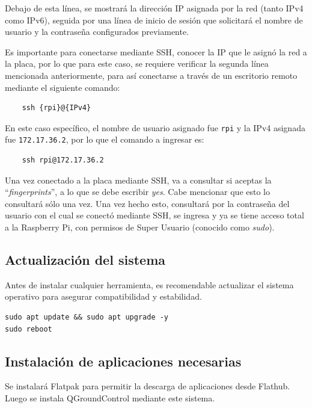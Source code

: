 \documentclass[12pt]{article}
\begin{document}
Debajo de esta línea, se mostrará la dirección IP asignada por la red (tanto IPv4 como IPv6), seguida por una línea de inicio de sesión que solicitará el nombre de usuario y la contraseña configurados previamente.

Es importante para conectarse mediante SSH, conocer la IP que le asignó la red a la placa, por lo que para este caso, se requiere verificar la segunda línea mencionada anteriormente, para así conectarse a través de un escritorio remoto mediante el siguiente comando:

\begin{lstlisting}
    ssh {rpi}@{IPv4}
\end{lstlisting}

En este caso específico, el nombre de usuario asignado fue \texttt{rpi} y la IPv4 asignada fue \texttt{172.17.36.2}, por lo que el comando a ingresar es:

\begin{lstlisting}
    ssh rpi@172.17.36.2
\end{lstlisting}

Una vez conectado a la placa mediante SSH, va a consultar si aceptas la ``\textit{fingerprints}'', a lo que se debe escribir \textit{yes}. Cabe mencionar que esto lo consultará sólo una vez. Una vez hecho esto, consultará por la contraseña del usuario con el cual se conectó mediante SSH, se ingresa y ya se tiene acceso total a la Raspberry Pi, con permisos de Super Usuario (conocido como \textit{sudo}).

\subsection{Actualización del sistema}

Antes de instalar cualquier herramienta, es recomendable actualizar el sistema operativo para asegurar compatibilidad y estabilidad.

\begin{lstlisting}
sudo apt update && sudo apt upgrade -y
sudo reboot
\end{lstlisting}

\subsection{Instalación de aplicaciones necesarias}

Se instalará Flatpak para permitir la descarga de aplicaciones desde Flathub. Luego se instala QGroundControl mediante este sistema.
\end{document}

